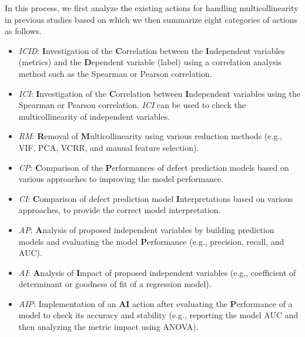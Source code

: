 In this process, we first analyze the existing actions for handling multicollinearity in previous studies based on which we then summarize eight categories of actions as follows.
\begin{itemize}
\item \textit{ICID}: \textbf{I}nvestigation of the \textbf{C}orrelation between the \textbf{I}ndependent variables (metrics) and the \textbf{D}ependent variable (label) using a correlation analysis method such as the Spearman or Pearson correlation.
\item \textit{ICI}: \textbf{I}nvestigation of the \textbf{C}orrelation between \textbf{I}ndependent variables using the Spearman or Pearson correlation. \textit{ICI} can be used to check the multicollinearity of independent variables.
\item \textit{RM}: \textbf{R}emoval of \textbf{M}ulticollinearity using various reduction methods (e.g., VIF, PCA, VCRR, and manual feature selection).%
\item \textit{CP}: \textbf{C}omparison of the \textbf{P}erformances of defect prediction models based on various approaches to improving the model performance. %
\item \textit{CI}: \textbf{C}omparison of defect prediction model \textbf{I}nterpretations based on various approaches, to provide the correct model interpretation.
\item \textit{AP}: \textbf{A}nalysis of proposed independent variables by building prediction models and evaluating the model \textbf{P}erformance (e.g., precision, recall, and AUC).
\item \textit{AI}: \textbf{A}nalysis of \textbf{I}mpact of proposed independent variables (e.g., coefficient of determinant or goodness of fit of a regression model).
\item \textit{AIP}: Implementation of an \textbf{AI} action after evaluating the \textbf{P}erformance of a model to check its accuracy and stability (e.g., reporting the model AUC and then analyzing the metric impact using ANOVA).
\end{itemize}

